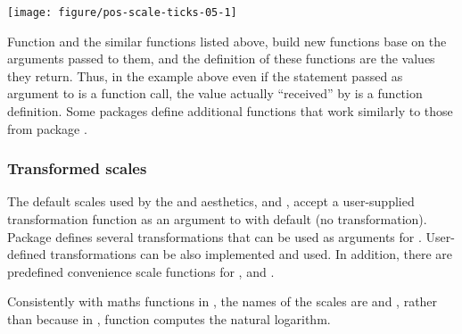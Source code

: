 \documentclass[krantz2]{krantz}\usepackage{knitr}
\begin{document}
\begin{knitrout}\footnotesize
{}\color{fgcolor}\begin{kframe}
\begin{alltt}
 \hlopt{+} 
\end{alltt}
\end{kframe}

{\centering \texttt{[image: figure/pos-scale-ticks-05-1]} 

}


\end{knitrout}



\begin{explainbox}
Function  and the similar functions listed above, build new functions base on the arguments passed to them, and the definition of these functions are the values they return. Thus, in the example above even if the statement passed as argument to  is a function call, the value actually ``received'' by  is a function definition. Some packages define additional functions that work similarly to those from package .
\end{explainbox}

\subsubsection{Transformed scales}\label{sec:plot:scales:trans}

The default scales used by the  and  aesthetics,  and , accept a user-supplied transformation function as an argument to  with default  (no transformation). Package  defines several transformations that can be used as arguments for . User-defined transformations can be also implemented and used. In addition, there are predefined convenience scale functions for ,  and .

\begin{warningbox}
  Consistently with maths functions in \Rlang, the names of the scales are  and , rather than  because in \Rlang, function  computes the natural logarithm.
\end{warningbox}
\end{document}
